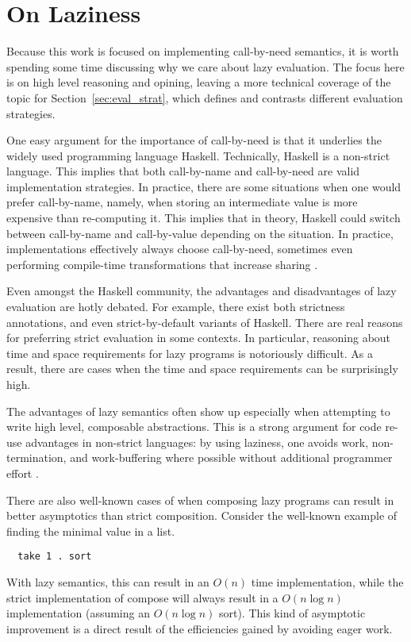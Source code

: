 \section{On Laziness}

Because this work is focused on implementing call-by-need semantics, it is worth
spending some time discussing why we care about lazy evaluation. The focus here
is on high level reasoning and opining, leaving a more technical coverage
of the topic for Section~\ref{sec:eval_strat}, which defines and contrasts
different evaluation strategies.

One easy argument for the importance of call-by-need is that it underlies the
widely used programming language Haskell. Technically, Haskell is a non-strict
language.  This implies that both call-by-name and call-by-need are valid
implementation strategies. In practice, there are some situations when one would
prefer call-by-name, namely, when storing an intermediate value is more
expensive than re-computing it. This implies that in theory, Haskell could
switch between call-by-name and call-by-value depending on the situation.  In
practice, implementations effectively always choose call-by-need, sometimes
even performing compile-time transformations that increase sharing
\cite{jones96floating}.  

Even amongst the Haskell community, the advantages and disadvantages of
lazy evaluation are hotly debated. For example, there exist both strictness
annotations, and even strict-by-default variants of Haskell. There are real
reasons for preferring strict evaluation in some contexts. In particular,
reasoning about time and space requirements for lazy programs is notoriously
difficult. As a result, there are cases when the time and space requirements can
be surprisingly high.

The advantages of lazy semantics often show up especially when attempting to
write high level, composable abstractions. This is a strong argument for code
re-use advantages in non-strict languages: by using laziness, one avoids work,
non-termination, and work-buffering where possible without additional programmer
effort \cite{hughes1989functional}.

There are also well-known cases of when composing lazy programs can result in
better asymptotics than strict composition. Consider the well-known example of
finding the minimal value in a list. 
\begin{verbatim}
  take 1 . sort
\end{verbatim}
With lazy semantics, this can result in an $O(n)$ time implementation, while the
strict implementation of compose will always result in a $O(n \log n)$
implementation (assuming an $O(n \log n)$ sort). This kind of asymptotic
improvement is a direct result of the efficiencies gained by avoiding eager
work. 

